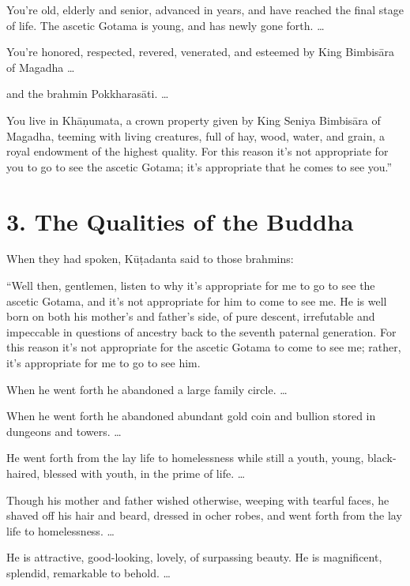 \documentclass[12pt,openany]{book}%
\begin{document}
You’re old, elderly and senior, advanced in years, and have reached the final stage of life. The ascetic Gotama is young, and has newly gone forth. … 

You’re honored, respected, revered, venerated, and esteemed by King \textsanskrit{Bimbisāra} of Magadha … 

and the brahmin \textsanskrit{Pokkharasāti}. … 

You live in \textsanskrit{Khāṇumata}, a crown property given by King Seniya \textsanskrit{Bimbisāra} of Magadha, teeming with living creatures, full of hay, wood, water, and grain, a royal endowment of the highest quality. For this reason it’s not appropriate for you to go to see the ascetic Gotama; it’s appropriate that he comes to see you.” 

\section*{3. The Qualities of the Buddha }

When they had spoken, \textsanskrit{Kūṭadanta} said to those brahmins: 

“Well then, gentlemen, listen to why it’s appropriate for me to go to see the ascetic Gotama, and it’s not appropriate for him to come to see me. He is well born on both his mother’s and father’s side, of pure descent, irrefutable and impeccable in questions of ancestry back to the seventh paternal generation. For this reason it’s not appropriate for the ascetic Gotama to come to see me; rather, it’s appropriate for me to go to see him. 

When he went forth he abandoned a large family circle. … 

When he went forth he abandoned abundant gold coin and bullion stored in dungeons and towers. … 

He went forth from the lay life to homelessness while still a youth, young, black-haired, blessed with youth, in the prime of life. … 

Though his mother and father wished otherwise, weeping with tearful faces, he shaved off his hair and beard, dressed in ocher robes, and went forth from the lay life to homelessness. … 

He is attractive, good-looking, lovely, of surpassing beauty. He is magnificent, splendid, remarkable to behold. … 
\end{document}
